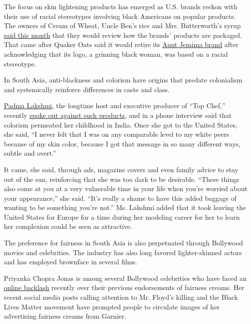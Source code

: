 The focus on skin lightening products has emerged as U.S. brands reckon
with their use of racial stereotypes involving black Americans on
popular products. The owners of Cream of Wheat, Uncle Ben's rice and
Mrs. Butterworth's syrup
\href{https://www.nytimes.com/2020/06/17/business/aunt-jemima-mrs-butterworth-uncle-ben.html}{said
this month} that they would review how the brands' products are
packaged. That came after Quaker Oats said it would retire its
\href{https://www.nytimes.com/2020/06/17/business/aunt-jemima-racial-stereotype.html}{Aunt
Jemima brand} after acknowledging that its logo, a grinning black woman,
was based on a racial stereotype.

In South Asia, anti-blackness and colorism have origins that predate
colonialism and systemically reinforce differences in caste and class.

\href{https://www.nytimes.com/2020/06/18/dining/padma-lakshmi-taste-the-nation.html?searchResultPosition=1}{Padma
Lakshmi}, the longtime host and executive producer of ``Top Chef,''
recently
\href{https://twitter.com/PadmaLakshmi/status/1270398009692610563}{spoke
out against such products}, and in a phone interview said that colorism
permeated her childhood in India. Once she got to the United States, she
said, ``I never felt that I was on any comparable level to my white
peers because of my skin color, because I got that message in so many
different ways, subtle and overt.''

It came, she said, through ads, magazine covers and even family advice
to stay out of the sun, reinforcing that she was too dark to be
desirable. ``These things also come at you at a very vulnerable time in
your life when you're worried about your appearance,'' she said. ``It's
really a shame to have this added baggage of wanting to be something
you're not.'' Ms. Lakshmi added that it took leaving the United States
for Europe for a time during her modeling career for her to learn her
complexion could be seen as attractive.

The preference for fairness in South Asia is also perpetuated through
Bollywood movies and celebrities. The industry has also long favored
lighter-skinned actors and has employed brownface in several films.

Priyanka Chopra Jonas is among several Bollywood celebrities who have
faced an
\href{https://www.thejuggernaut.com/skin-whitening-industry}{online
backlash} recently over their previous endorsements of fairness creams.
Her recent social media posts calling attention to Mr. Floyd's killing
and the Black Lives Matter movement have prompted people to circulate
images of her advertising fairness creams from Garnier.

